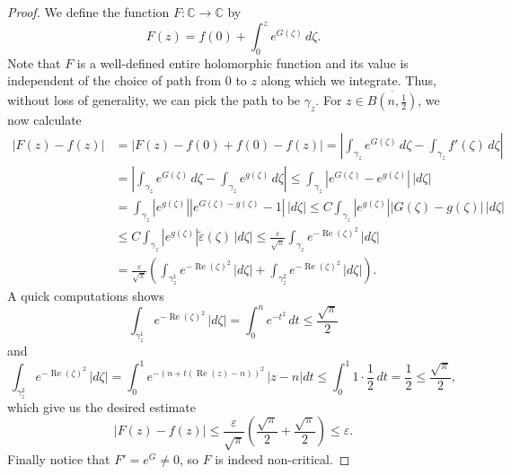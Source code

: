\documentclass[10pt,a4paper]{amsart}
\DeclareMathOperator{\re}{Re}
\newcommand{\C}{\mathbb C}
\newcommand{\abs}[1]{\left|#1\right|}
\begin{document}
\begin{proof}
We define the function $F \colon \C \to \C$ by
\[F(z) = f(0) + \int_0^z e^{G(\zeta)} \, d\zeta.\]
Note that $F$ is a well-defined entire holomorphic function and its value is independent of the choice of path from $0$ to $z$ along which we integrate. Thus, without loss of generality, we can pick the path to be $\gamma_z$.
For $z \in \overline{B\left(n, \frac{1}{2}\right)}$, we now calculate
\begin{align*}
    \abs{F(z) - f(z)} &= \abs{F(z) - f(0) + f(0) - f(z)} = \abs{\int_{\gamma_z} e^{G(\zeta)} \, d\zeta - \int_{\gamma_z} f'(\zeta) \, d\zeta} \\
    &= \abs{\int_{\gamma_z} e^{G(\zeta)} \, d\zeta - \int_{\gamma_z} e^{g(\zeta)} \, d\zeta} \le \int_{\gamma_z} \abs{e^{G(\zeta)} - e^{g(\zeta)}} \, \abs{d\zeta} \\
    &= \int_{\gamma_z} \abs{e^{g(\zeta)}}\abs{e^{G(\zeta)-g(\zeta)} - 1} \, \abs{d\zeta} \le C \int_{\gamma_z} \abs{e^{g(\zeta)}}\abs{G(\zeta)-g(\zeta)} \, \abs{d\zeta} \\
    &\le C\int_{\gamma_z} \abs{e^{g(\zeta)}}\tilde{\varepsilon}(\zeta) \, \abs{d\zeta} \le \frac{\varepsilon}{\sqrt{\pi}} \int_{\gamma_z} e^{-\re(\zeta)^2} \, \abs{d\zeta} \\
    &= \frac{\varepsilon}{\sqrt{\pi}} \left(\int_{\gamma_z^1} e^{-\re(\zeta)^2} \, \abs{d\zeta} + \int_{\gamma_z^2} e^{-\re(\zeta)^2} \, \abs{d\zeta}\right).
\end{align*}
A quick computations shows
\[\int_{\gamma_z^1} e^{-\re(\zeta)^2} \, \abs{d\zeta} = \int_0^n e^{-t^2} \, dt \le \frac{\sqrt{\pi}}{2}\]
and 
\[\int_{\gamma_z^2} e^{-\re(\zeta)^2} \, \abs{d\zeta} = \int_0^1 e^{-(n + t(\re(z)-n))^2} \, \abs{z-n}dt \le \int_0^1 1 \cdot \frac{1}{2} \, dt = \frac{1}{2} \le \frac{\sqrt{\pi}}{2},\]
which give us the desired estimate 
\[\abs{F(z) - f(z)} \le \frac{\varepsilon}{\sqrt{\pi}} \left(\frac{\sqrt{\pi}}{2} + \frac{\sqrt{\pi}}{2}\right) \le \varepsilon.\]
Finally notice that $F' = e^{G} \neq 0$, so $F$ is indeed non-critical. 
\end{proof}
\end{document}
